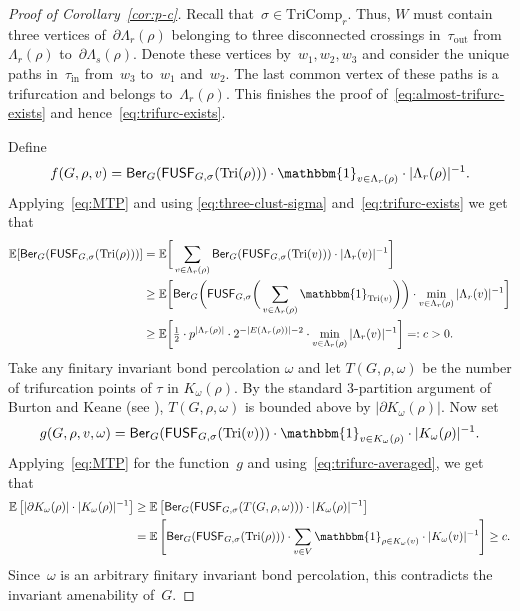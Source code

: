 \documentclass[11pt,letterpaper]{amsart}
\newcounter{n}
\numberwithin{n}{section}
\theoremstyle{plain}
\theoremstyle{definition}
\theoremstyle{remark}
\newcommand{\1}{\mathbbm{1}}
\begin{document}
\begin{proof}[Proof of Corollary~\ref{cor:p-c}]
Recall that~$\sigma\in \mathrm{TriComp}_r$.
Thus, $W$ must contain three vertices of~$\partial\Lambda_r(\rho)$ belonging to three disconnected crossings in~$\tau_\mathrm{out}$ from~$\Lambda_r(\rho)$ to~$\partial\Lambda_s(\rho)$.
Denote these vertices by~$w_1,w_2,w_3$ and consider the unique paths in~$\tau_\mathrm{in}$ from~$w_3$ to~$w_1$ and~$w_2$.
The last common vertex of these paths is a trifurcation and belongs to~$\Lambda_r(\rho)$.
This finishes the proof of~\eqref{eq:almost-trifurc-exists} and hence~\eqref{eq:trifurc-exists}.

Define 
\[
	f(G,\rho,v) = \mathsf{Ber}_G(\mathsf{FUSF}_{G,\sigma}(\mathrm{Tri}(\rho)))\cdot \1_{v \in \Lambda_r(\rho)}\cdot |\Lambda_r(\rho)|^{-1}.
\]
Applying~\eqref{eq:MTP} and using \eqref{eq:three-clust-sigma} and~\eqref{eq:trifurc-exists} we get that
\begin{align}
	\mathbb{E}[ \mathsf{Ber}_G( \mathsf{FUSF}_{G,\sigma} (\mathrm{Tri}(\rho) ) )] 
	&= \mathbb{E} \bigg[\sum_{v \in \Lambda_r(\rho) } \mathsf{Ber}_G( \mathsf{FUSF}_{G,\sigma} ( \mathrm{Tri}(v) ) )\cdot |\Lambda_r(v)|^{-1}\bigg] \nonumber  \\
	&\geq \mathbb{E} \bigg[\mathsf{Ber}_G \bigg(  \mathsf{FUSF}_{G,\sigma}\bigg( \sum_{v \in \Lambda_r(\rho) } \1_{ \mathrm{Tri}(v)} \bigg) \bigg) \cdot \min_{v \in \Lambda_r(\rho)} |\Lambda_r(v)|^{-1} \bigg] \nonumber \\
	\label{eq:trifurc-averaged}
	&\geq \mathbb{E} \bigg[\tfrac12\cdot p^{|\Lambda_r(\rho)|} \cdot 2^{-|E(\Lambda_r(\rho))|-2} \cdot \min_{v \in \Lambda_r(\rho)} |\Lambda_r(v)|^{-1} \bigg]  =: c > 0.
\end{align}
Take any finitary invariant bond percolation $\omega$ and
let $T(G,\rho,\omega)$ be the number of trifurcation points of $\tau$ in $K_{\omega}(\rho)$. By the standard 3-partition argument of Burton and Keane (see \cite[Lemma 8.5]{Gri99a}), $T(G,\rho,\omega)$ is bounded above by $|\partial K_\omega(\rho)|$.
Now set
\[
	g(G,\rho,v,\omega) = \mathsf{Ber}_G( \mathsf{FUSF}_{G,\sigma} (\mathrm{Tri}(v) ) ) \cdot \1_{v \in K_{\omega}(\rho)}\cdot |K_{\omega}(\rho)|^{-1}.
\]
Applying~\eqref{eq:MTP} for the function~$g$ and using~\eqref{eq:trifurc-averaged}, we get that
\begin{align*}
	\mathbb{E}\left[|\partial K_{\omega}(\rho)|\cdot |K_{\omega}(\rho)|^{-1} \right] 
	 &\geq \mathbb{E}\left[\mathsf{Ber}_G( \mathsf{FUSF}_{G,\sigma}(T(G,\rho,\omega)))\cdot |K_\omega(\rho)|^{-1} \right] \\
	 &= \mathbb{E}\left [\mathsf{Ber}_G( \mathsf{FUSF}_{G,\sigma}(\mathrm{Tri}(\rho) ) ) \cdot \sum_{v\in  V}  \1_{\rho \in K_{\omega}(v)}\cdot |K_{\omega}(v)|^{-1} \right] \geq c.
\end{align*}
Since~$\omega$ is an arbitrary finitary invariant bond percolation, this contradicts the invariant amenability of~$G$.
\end{proof}
\end{document}
